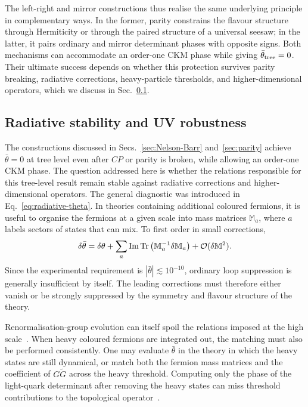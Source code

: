 \documentclass[review]{elsarticle}
\numberwithin{equation}{section}
\numberwithin{table}{section}
\numberwithin{figure}{section}
\def\tr{\mathrm{Tr}}
\begin{document}
The left-right and mirror constructions thus realise the same underlying principle in complementary ways. In the former, parity constrains the flavour structure through Hermiticity or through the paired structure of a universal seesaw; in the latter, it pairs ordinary and mirror determinant phases with opposite signs. Both mechanisms can accommodate an order-one CKM phase while giving $\bar\theta_{\rm tree}=0$. Their ultimate success depends on whether this protection survives parity breaking, radiative corrections, heavy-particle thresholds, and higher-dimensional operators, which we discuss in Sec.~\ref{sec:CP-parity-radiative}.

\subsection{Radiative stability and UV robustness}
\label{sec:CP-parity-radiative}

The constructions discussed in Secs.~\ref{sec:Nelson-Barr} and~\ref{sec:parity} achieve $\bar\theta=0$ at tree level even after $CP$ or parity is broken, while allowing an order-one CKM phase. The question addressed here is whether the relations responsible for this tree-level result remain stable against radiative corrections and higher-dimensional operators. The general diagnostic was introduced in Eq.~\eqref{eq:radiative-theta}. In theories containing additional coloured fermions, it is useful to organise the fermions at a given scale into mass matrices $\mathbb M_a$, where $a$ labels sectors of states that can mix. To first order in small corrections,
\begin{align}
    \delta\bar\theta = \delta\theta
    + \sum_a {\rm Im}\,\tr
    \left( \mathbb M_a^{-1}\delta\mathbb M_a
    \right) + \mathcal{O}(\delta\mathbb M^2).
    \label{eq:radiative-theta-full}
\end{align}
Since the experimental requirement is $|\bar\theta|\lesssim10^{-10}$, ordinary loop suppression is generally insufficient by itself. The leading corrections must therefore either vanish or be strongly suppressed by the symmetry and flavour structure of the theory.

Renormalisation-group evolution can itself spoil the relations imposed at the high scale~\cite{Peccei:1995fg,Xing:2015sva}. When heavy coloured fermions are integrated out, the matching must also be performed consistently. One may evaluate $\bar\theta$ in the theory in which the heavy states are still dynamical, or match both the fermion mass matrices and the coefficient of $G\widetilde G$ across the heavy threshold. Computing only the phase of the light-quark determinant after removing the heavy states can miss threshold contributions to the topological operator~\cite{Hisano:2023izx}.
\end{document}
